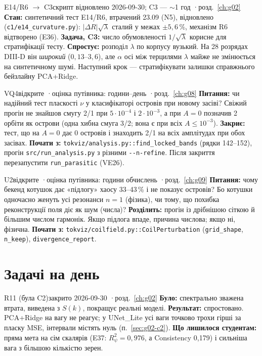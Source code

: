 \begin{itemcard}{E14/R6 $\to$ C3}{скрипт відновлено 2026-09-30; C3 --- $\sim$1 год \quad·\quad розд.~\ref{ch:g02}}
\textbf{Стан:} синтетичний тест E14/R6, втрачений 23.09 (N5), відновлено
(\texttt{c1/e14\_curvature.py}): $|\Delta R|\sqrt\lambda$ сталий у межах $\pm5{,}6\,\%$, механізм R6
відтворено (E36). \textbf{Задача, C3:} число обумовленості $1/\sqrt\lambda$ корисне для
стратифікації тесту. \textbf{Спростує:} розподіл $\lambda$ по корпусу вузький. На 28 розрядах
DIII-D він \emph{широкий} ($0{,}13\text{--}3{,}6$), але $\alpha$ осі між терцилями $\lambda$ майже не
змінюється на синтетичному шумі. Наступний крок --- стратифікувати залишки справжнього
бейзлайну PCA+Ridge.
\end{itemcard}

\begin{itemcard}{VQ4}{відкрите \quad·\quad оцінка путівника: години--день \quad·\quad розд.~\ref{ch:g08}}
\textbf{Питання:} чи надійний тест пласкості $\nu$ у класифікаторі островів при новому засіві?
Свіжий прогін не знайшов смугу 2/1 при $5\cdot10^{-4}$ і $2\cdot10^{-3}$, а при $A=0$ позначив 2
орбіти як острови (одна хибна смуга 3/2; вона є при всіх $A\le10^{-3}$). \textbf{Закриє:} тест, що на $A=0$ дає 0 островів і знаходить 2/1 на всіх
амплітудах при обох засівах. \textbf{Почати з:} \texttt{tokviz/analysis.py::find\_locked\_bands}
(рядки 142--152), прогін \verb|src/run_analysis.py| з різними \verb|--n-refine|. Після
закриття перезапустити \texttt{run\_parasitic} (VE26).
\end{itemcard}

\begin{itemcard}{U2}{відкрите \quad·\quad оцінка путівника: години обчислень \quad·\quad розд.~\ref{ch:g09}}
\textbf{Питання:} чому бекенд котушок дає «підлогу» хаосу 33--43\,\% і не показує островів? Бо
котушки одночасно женуть усі резонанси $n=1$ (фізика), чи тому, що похибка реконструкції поля
діє як шум (числа)? \textbf{Розділить:} прогін із дрібнішою сіткою й більшим числом гармонік.
Якщо підлога впаде, причина числова; якщо ні, фізична. \textbf{Почати з:}
\texttt{tokviz/coilfield.py::CoilPerturbation} (\verb|grid_shape|, \verb|n_keep|),
\verb|divergence_report|.
\end{itemcard}

\section{Задачі на день}\label{sec:g10-day}

\begin{itemcard}{R11 (була C2)}{закрито 2026-09-30 \quad·\quad розд.~\ref{ch:g02}}
\textbf{Було:} спектрально зважена втрата, виведена з $S(k)$, покращує реальні моделі.
\textbf{Результат:} спростовано. PCA+Ridge на вагу не реагує; у UNet\_Lite усі ваги точково трохи
гірші за пласку MSE, інтервали містять нуль (п.~\ref{sec:g02-c2}). \textbf{Що лишилося
студентам:} пряма мета на сім скалярів (E37: $R^2_\psi=0{,}976$, а Consistency 0,179) і
сильніша вага з більшою кількістю зерен.
\end{itemcard}

